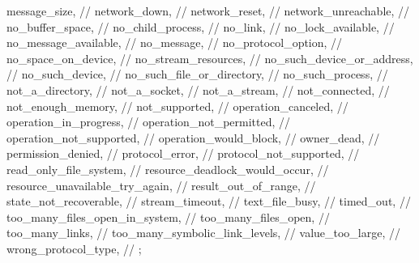 \begin{codeblock}
{{    message_size,                       // 
    network_down,                       // 
    network_reset,                      // 
    network_unreachable,                // 
    no_buffer_space,                    // 
    no_child_process,                   // 
    no_link,                            // 
    no_lock_available,                  // 
    no_message_available,               // 
    no_message,                         // 
    no_protocol_option,                 // 
    no_space_on_device,                 // 
    no_stream_resources,                // 
    no_such_device_or_address,          // 
    no_such_device,                     // 
    no_such_file_or_directory,          // 
    no_such_process,                    // 
    not_a_directory,                    // 
    not_a_socket,                       // 
    not_a_stream,                       // 
    not_connected,                      // 
    not_enough_memory,                  // 
    not_supported,                      // 
    operation_canceled,                 // 
    operation_in_progress,              // 
    operation_not_permitted,            // 
    operation_not_supported,            // 
    operation_would_block,              // 
    owner_dead,                         // 
    permission_denied,                  // 
    protocol_error,                     // 
    protocol_not_supported,             // 
    read_only_file_system,              // 
    resource_deadlock_would_occur,      // 
    resource_unavailable_try_again,     // 
    result_out_of_range,                // 
    state_not_recoverable,              // 
    stream_timeout,                     // 
    text_file_busy,                     // 
    timed_out,                          // 
    too_many_files_open_in_system,      // 
    too_many_files_open,                // 
    too_many_links,                     // 
    too_many_symbolic_link_levels,      // 
    value_too_large,                    // 
    wrong_protocol_type,                // 
  };

}
\end{codeblock}
